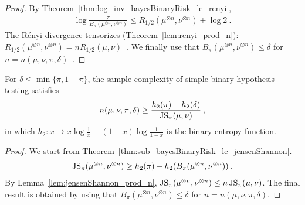 \begin{proof}%
{}
By Theorem~\ref{thm:log_inv_bayesBinaryRisk_le_renyi},
\begin{align*}
\log\frac{\pi}{B_\pi(\mu^{\otimes n}, \nu^{\otimes n})} \le R_{1/2}(\mu^{\otimes n}, \nu^{\otimes n}) + \log 2
\: .
\end{align*}
The Rényi divergence tensorizes (Theorem~\ref{lem:renyi_prod_n}): $R_{1/2}(\mu^{\otimes n}, \nu^{\otimes n}) = n R_{1/2}(\mu, \nu)$~.
We finally use that $B_\pi(\mu^{\otimes n}, \nu^{\otimes n}) \le \delta$ for $n = n(\mu, \nu, \pi, \delta)$~.
\end{proof}


\begin{lemma}
  \label{lem:binaryPriorSampleComplexity_ge_jensenShannon}
  For $\delta \le \min\{\pi, 1 - \pi\}$, the sample complexity of simple binary hypothesis testing satisfies
  \begin{align*}
  n(\mu, \nu, \pi, \delta) \ge \frac{h_2(\pi) - h_2(\delta)}{\operatorname{JS}_\pi(\mu, \nu)}
  \: ,
  \end{align*}
  in which $h_2: x \mapsto x\log\frac{1}{x} + (1 - x)\log\frac{1}{1 - x}$ is the binary entropy function.
\end{lemma}

\begin{proof}%
{}
We start from Theorem~\ref{thm:sub_bayesBinaryRisk_le_jensenShannon}.
\begin{align*}
\operatorname{JS}_\pi(\mu^{\otimes n}, \nu^{\otimes n}) \ge h_2(\pi) - h_2(B_\pi(\mu^{\otimes n}, \nu^{\otimes n})) \: .
\end{align*}
By Lemma~\ref{lem:jensenShannon_prod_n}, $\operatorname{JS}_\pi(\mu^{\otimes n}, \nu^{\otimes n}) \le n \operatorname{JS}_\pi(\mu, \nu)$. The final result is obtained by using that $B_\pi(\mu^{\otimes n}, \nu^{\otimes n}) \le \delta$ for $n = n(\mu, \nu, \pi, \delta)$.
\end{proof}